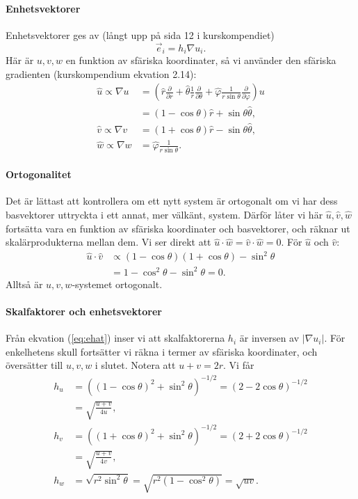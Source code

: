 \documentclass[%
oneside,                 %
final,                   %
10pt]{article}
\newenvironment{doconceexercise}{}{}
\begin{document}
\begin{doconceexercise}
\paragraph{Enhetsvektorer}
Enhetsvektorer ges av (långt upp på sida 12 i kurskompendiet)
\begin{equation}
    \vec e_i=h_i\nabla u_i. 
    \label{eq:ehat}
\end{equation}
Här är $u,v,w$ en funktion av sfäriska koordinater, så vi använder den sfäriska gradienten (kurskompendium ekvation 2.14):
\begin{align}
    \hat u\propto\nabla u&= \left(\hat r\frac{\partial}{\partial r}+\hat\theta\frac 1r\frac{\partial}{\partial \theta}+\hat\varphi\frac1{r\sin\theta}\frac{\partial}{\partial \varphi}\right)u\nonumber\\
    &=(1-\cos\theta)\hat r+\sin\theta\hat\theta,\\
    \hat v\propto\nabla v&=(1+\cos\theta)\hat r-\sin\theta\hat\theta,\\
    \hat w\propto\nabla w&=\hat\varphi\frac1{r\sin\theta}.
\end{align}

\paragraph{Ortogonalitet}
Det är lättast att kontrollera om ett nytt system är ortogonalt om vi har dess basvektorer uttryckta i ett annat, mer välkänt, system. Därför låter vi här $\hat u, \hat v,\hat w$ fortsätta vara en funktion av sfäriska koordinater och basvektorer, och räknar ut skalärprodukterna mellan dem. Vi ser direkt att $\hat u\cdot \hat w=\hat v\cdot\hat w=0$. För $\hat u$ och $\hat v$:
\begin{align}
    \hat u\cdot\hat v&\propto(1-\cos\theta)(1+\cos\theta)-\sin^2\theta\nonumber\\
    &=1-\cos^2\theta-\sin^2\theta=0.
\end{align}
Alltså är $u,v,w$-systemet ortogonalt.

\paragraph{Skalfaktorer och enhetsvektorer}
Från ekvation (\ref{eq:ehat}) inser vi att skalfaktorerna $h_i$ är inversen av $|\nabla u_i|$. För enkelhetens skull fortsätter vi räkna i termer av sfäriska koordinater, och översätter till $u,v,w$ i slutet. Notera att $u+v=2r$. Vi får
\begin{align}
    h_u&=\left((1-\cos\theta)^2+\sin^2\theta\right)^{-1/2}=\left(2-2\cos\theta\right)^{-1/2}\nonumber\\
    &=\sqrt{\frac{u+v}{4u}},\\
    h_v&=\left((1+\cos\theta)^2+\sin^2\theta\right)^{-1/2}=\left(2+2\cos\theta\right)^{-1/2}\nonumber\\
    &=\sqrt{\frac{u+v}{4v}},\\
    h_w&=\sqrt{r^2\sin^2\theta}=\sqrt{r^2(1-\cos^2\theta)}=\sqrt{uv}. 
\end{align}


\end{doconceexercise}
\end{document}
